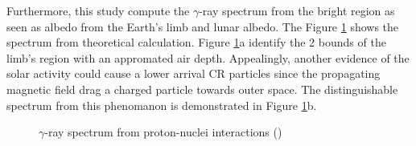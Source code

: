 Furthermore, this study compute the $\gamma$-ray spectrum from 
the bright region as seen as albedo from the Earth's limb and 
lunar albedo. The Figure \ref{fig:gamma_spectrum_earth_lunar} 
shows the spectrum from theoretical calculation. Figure \ref{fig:gamma_spectrum_earth_lunar}a
identify the 2 bounds of the limb's region with an appromated air depth.
Appealingly, another evidence of the solar activity could cause 
a lower arrival CR particles since the propagating magnetic field 
drag a charged particle towards outer space. The distinguishable
spectrum from this phenomanon is demonstrated in
Figure \ref{fig:gamma_spectrum_earth_lunar}b.


\begin{figure}[h!]
    \centering
        \hfill
        \caption{
            $\gamma$-ray spectrum from proton-nuclei interactions
            (\cite{Morris84})
        }
       \label{fig:gamma_spectrum_earth_lunar}
\end{figure}



